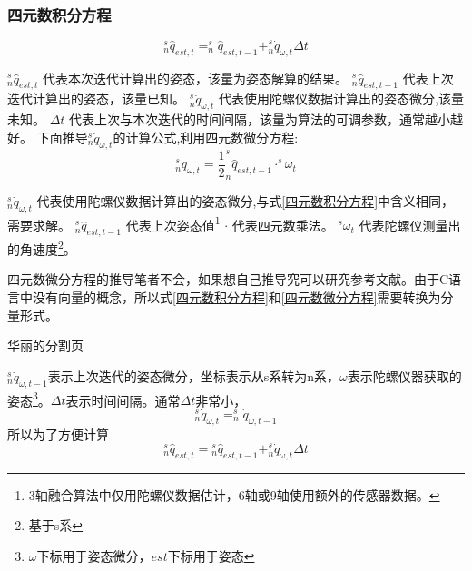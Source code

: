 

\subsubsection{四元数积分方程}
\begin{equation}\label{四元数积分方程}
    ^s_n\hat{q}_{est,t}=^s_n\hat{q}_{est,t-1}+^s_n\dot{q}_{\omega,t}\Delta t
\end{equation} 

$^s_n\hat{q}_{est,t}$    代表本次迭代计算出的姿态，该量为姿态解算的结果。
$^s_n\hat{q}_{est,t-1}$  代表上次迭代计算出的姿态，该量已知。
$^s_n\dot{q}_{\omega,t}$ 代表使用陀螺仪数据计算出的姿态微分,该量未知。
$\Delta t$               代表上次与本次迭代的时间间隔，该量为算法的可调参数，通常越小越好。
下面推导$^s_n\dot{q}_{\omega,t}$的计算公式,利用四元数微分方程:
\begin{equation}\label{四元数微分方程}
    ^s_n\dot{q}_{\omega,t}=\frac{1}{2} ^s_n\hat{q}_{est,t-1} \cdot ^s\omega_t
\end{equation} 

$^s_n\dot{q}_{\omega,t}$ 代表使用陀螺仪数据计算出的姿态微分,与式\ref{四元数积分方程}中含义相同，需要求解。
$^s_n\hat{q}_{est,t-1}$  代表上次姿态值\footnote{3轴融合算法中仅用陀螺仪数据估计，6轴或9轴使用额外的传感器数据。}
$\cdot$                  代表四元数乘法。
$^s\omega_t$             代表陀螺仪测量出的角速度\footnote{基于s系}。

四元数微分方程的推导笔者不会，如果想自己推导究可以研究参考文献\citet{四元数微分方程的推导}。由于C语言中没有向量的概念，所以式\ref{四元数积分方程}和\ref{四元数微分方程}需要转换为分量形式。

\newpage
华丽的分割页
\newpage













$^s_n\dot{q}_{\omega,t-1}$表示上次迭代的姿态微分，坐标表示从s系转为n系，$\omega$表示陀螺仪器获取的姿态\footnote{$\omega$下标用于姿态微分，$est$下标用于姿态}。$\Delta t$表示时间间隔。通常$\Delta t$非常小，
\begin{equation}\label{近似1}
^s_n\dot{q}_{\omega,t}=^s_n\dot{q}_{\omega,t-1}
\end{equation}
所以为了方便计算
\begin{equation}\label{四元数积分方程2}
    ^s_n\hat{q}_{est,t}={^s_n\hat{q}_{est,t-1}}+^s_n\dot{q}_{\omega,t}\Delta t
\end{equation}

